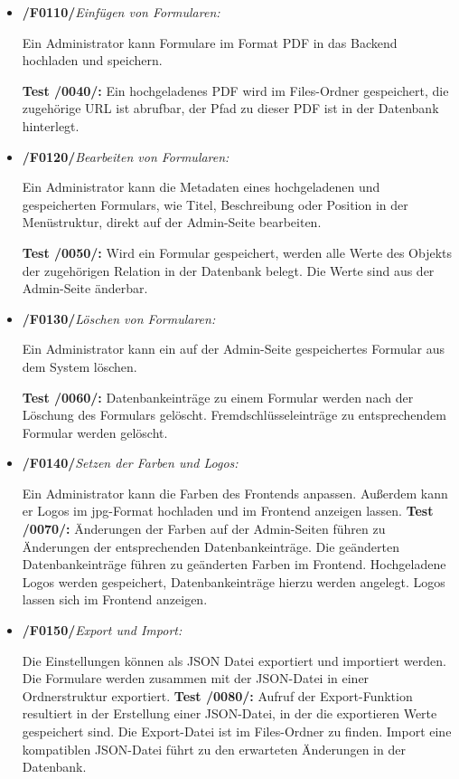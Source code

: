     \begin{itemize}
        \item \textbf{/F0110/}\textit{Einfügen von Formularen:} \par
        Ein Administrator kann Formulare im Format PDF in das Backend hochladen und speichern.\par
        \noindent \textbf{Test /0040/:} Ein hochgeladenes PDF wird im Files-Ordner gespeichert, die zugehörige URL ist abrufbar, der Pfad zu dieser PDF ist in der Datenbank hinterlegt.
        
        \item \textbf{/F0120/}\textit{Bearbeiten von Formularen:} \par
        Ein Administrator kann die Metadaten eines hochgeladenen und gespeicherten Formulars, wie Titel, Beschreibung oder Position in der Menüstruktur, direkt auf der Admin-Seite bearbeiten.\par
        \noindent \textbf{Test /0050/:} Wird ein Formular gespeichert, werden alle Werte des Objekts der zugehörigen Relation in der Datenbank belegt. Die Werte sind aus der Admin-Seite änderbar.
        
        \item \textbf{/F0130/}\textit{Löschen von Formularen:} \par
        Ein Administrator kann ein auf der Admin-Seite gespeichertes Formular aus dem System löschen.\par
        \noindent \textbf{Test /0060/:} Datenbankeinträge zu einem Formular werden nach der Löschung des Formulars gelöscht. Fremdschlüsseleinträge zu entsprechendem Formular werden gelöscht.
        
        \item \textbf{/F0140/}\textit{Setzen der Farben und Logos:} \par 
        Ein Administrator kann die Farben des Frontends anpassen. Außerdem kann er Logos im jpg-Format hochladen und im Frontend anzeigen lassen.
        \noindent \textbf{Test /0070/:} Änderungen der Farben auf der Admin-Seiten führen zu Änderungen der entsprechenden Datenbankeinträge. Die geänderten Datenbankeinträge führen zu geänderten Farben im Frontend. Hochgeladene Logos werden gespeichert, Datenbankeinträge hierzu werden angelegt. Logos lassen sich im Frontend anzeigen.
        
        \item \textbf{/F0150/}\textit{Export und Import:} \par
        Die Einstellungen können als JSON Datei exportiert und importiert werden. Die Formulare werden zusammen mit der JSON-Datei in einer Ordnerstruktur exportiert.
        \noindent \textbf{Test /0080/:} Aufruf der Export-Funktion resultiert in der Erstellung einer JSON-Datei, in der die exportieren Werte gespeichert sind. Die Export-Datei ist im Files-Ordner zu finden. Import eine kompatiblen JSON-Datei führt zu den erwarteten Änderungen in der Datenbank.
    \end{itemize}{}
  
